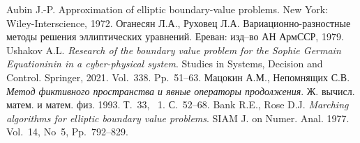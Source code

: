 \begin{thebibliography}{99}
 Aubin J.-P. Approximation of elliptic boundary-value problems. New York: Wiley-Interscience, 1972.
 Оганесян Л.А., Руховец Л.А. Вариационно-разностные методы решения эллиптических уравнений. Ереван: изд–во АН АрмССР, 1979.
 Ushakov A.L. {\it Research of the boundary value problem for the Sophie Germain Equationinin in a cyber-physical system}. Studies in Systems, Decision and Control. Springer, 2021. Vol.~338. Pp.~51–63.
 Мацокин А.М., Непомнящих С.В. {\it Метод фиктивного пространства и явные операторы продолжения}. Ж. вычисл. матем. и матем. физ. 1993.  Т.~33, \textnumero~1.  С.~52–68.
 Bank R.E., Rose D.J. {\it Marching algorithms for elliptic boundary value problems}. SIAM J. on Numer. Anal. 1977. Vol.~14, No~5, Pp.~792–829.
\end{thebibliography}





%

